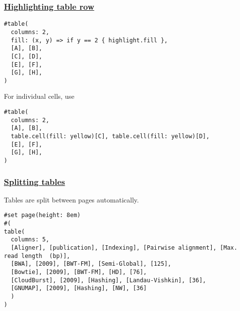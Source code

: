 \pandocbounded{}

\subsubsection{\texorpdfstring{\hyperref[highlighting-table-row]{Highlighting
table row}}{Highlighting table row}}\label{highlighting-table-row}

\begin{verbatim}
#table(
  columns: 2,
  fill: (x, y) => if y == 2 { highlight.fill },
  [A], [B],
  [C], [D],
  [E], [F],
  [G], [H],
)
\end{verbatim}

\pandocbounded{}

For individual cells, use

\begin{verbatim}
#table(
  columns: 2,
  [A], [B],
  table.cell(fill: yellow)[C], table.cell(fill: yellow)[D],
  [E], [F],
  [G], [H],
)
\end{verbatim}

\pandocbounded{}

\subsubsection{\texorpdfstring{\hyperref[splitting-tables]{Splitting
tables}}{Splitting tables}}\label{splitting-tables}

Tables are split between pages automatically.

\begin{verbatim}
#set page(height: 8em)
#(
table(
  columns: 5,
  [Aligner], [publication], [Indexing], [Pairwise alignment], [Max. read length  (bp)],
  [BWA], [2009], [BWT-FM], [Semi-Global], [125],
  [Bowtie], [2009], [BWT-FM], [HD], [76],
  [CloudBurst], [2009], [Hashing], [Landau-Vishkin], [36],
  [GNUMAP], [2009], [Hashing], [NW], [36]
  )
)
\end{verbatim}

\pandocbounded{}

\pandocbounded{}

